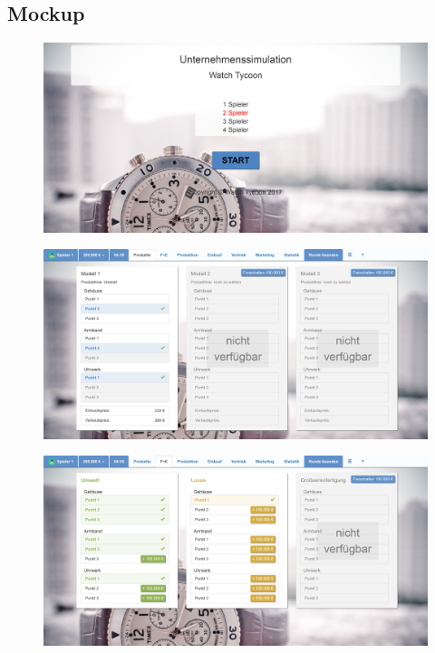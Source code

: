 \subsection{Mockup}
\begin{figure} [h]
	\centering
	\includegraphics[scale=0.1]{img/bilder_layout/MockUp1.jpg} 
\end{figure}
\begin{figure}
	\centering
	\includegraphics[scale=0.1]{img/bilder_layout/MockUp2.jpg} 
\end{figure}
\begin{figure} 
	\centering
	\includegraphics[scale=0.1]{img/bilder_layout/MockUp3.jpg} 
\end{figure}
